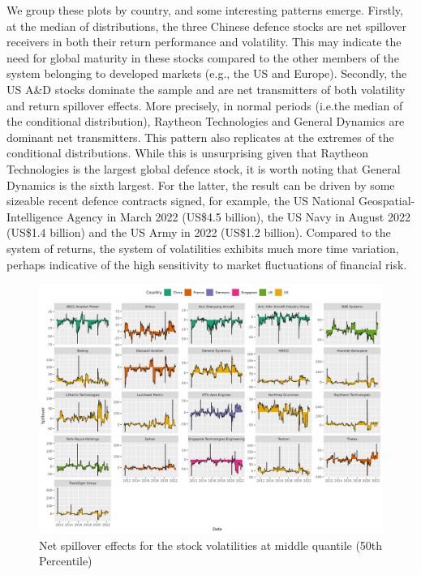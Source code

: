 \documentclass[
  letterpaper,
  DIV=11,
  numbers=noendperiod]{scrartcl}
\begin{document}
We group these plots by country, and some interesting patterns emerge.
Firstly, at the median of distributions, the three Chinese defence
stocks are net spillover receivers in both their return performance and
volatility. This may indicate the need for global maturity in these
stocks compared to the other members of the system belonging to
developed markets (e.g., the US and Europe). Secondly, the US A\&D
stocks dominate the sample and are net transmitters of both volatility
and return spillover effects. More precisely, in normal periods (i.e.the
median of the conditional distribution), Raytheon Technologies and
General Dynamics are dominant net transmitters. This pattern also
replicates at the extremes of the conditional distributions. While this
is unsurprising given that Raytheon Technologies is the largest global
defence stock, it is worth noting that General Dynamics is the sixth
largest. For the latter, the result can be driven by some sizeable
recent defence contracts signed, for example, the US National
Geospatial-Intelligence Agency in March 2022 (US\$4.5 billion), the US
Navy in August 2022 (US\$1.4 billion) and the US Army in 2022 (US\$1.2
billion). Compared to the system of returns, the system of volatilities
exhibits much more time variation, perhaps indicative of the high
sensitivity to market fluctuations of financial risk.

\begin{figure}
\centering
  \includegraphics{plots/fig-volnet50.png}
  \caption{Net spillover effects for the stock volatilities at middle quantile (50th Percentile)}
  \label{fig:volnet50}
\end{figure}
\end{document}
